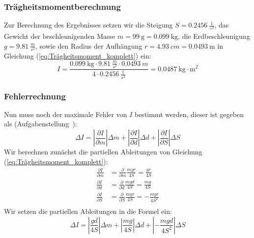 \documentclass{article}
\begin{document}
	\subsubsection{Trägheitsmomentberechnung}
	Zur Berechnung des Ergebnisses setzen wir die Steigung \(S = \SI{0,2456}{\frac{1}{\second^2}} \), das Gewicht der beschleunigenden Masse \(m = \SI{99}{\gram} = \SI{0.099}{\kilogram}\), die Erdbeschleunigung
	\(g = \SI{9,81}{\frac{m}{s^2}} \), sowie den Radius der Aufhängung \(r = \SI{4.93}{cm} = \SI{0.0493}{\metre}\) in Gleichung (\ref{eq:Trägheitsmoment_komplett}) ein:
	\begin{equation}
		I = \frac{ \SI{0,099}{\kilogram} \cdot \SI{9,81}{\frac{m}{s^2}} \cdot \SI{0,0493}{m} }{ 4 \cdot \SI{0,2456}{\frac{1}{s^2}} } = \SI{0,0487}{\kilogram \cdot \metre^2}
	\end{equation}

	\subsubsection{Fehlerrechnung}
	Nun muss noch der maximale Fehler von \( I \) bestimmt werden, dieser ist gegeben als (Aufgabenstellung~\cite{AnleitungPraktikum}):
	\begin{equation}
		\Delta I =
		\left| \frac{\partial I}{\partial m} \right| \Delta m +
		\left| \frac{\partial I}{\partial d} \right| \Delta d +
		\left| \frac{\partial I}{\partial S} \right| \Delta S
	\end{equation}
	Wir berechnen zunächst die partiellen Ableitungen von Gleichung (\ref{eq:Trägheitsmoment_komplett}):
	\begin{equation}
		\begin{aligned}
			\frac{\partial I}{\partial m} & = \frac{\partial}{\partial m} \frac{m g r}{4S} = \frac{g r}{4S}     \\
			\frac{\partial I}{\partial d} & = \frac{\partial}{\partial d} \frac{m g d}{4S} = \frac{m g}{4S}     \\
			\frac{\partial I}{\partial S} & = \frac{\partial}{\partial S} \frac{m g r}{4S} = -\frac{m g r}{4S^2} \\
		\end{aligned}
	\end{equation}
	Wir setzen die partiellen Ableitungen in die Formel ein:
	\begin{equation}
		\Delta I =
		\left| \frac{g d}{4S} \right| \Delta m +
		\left| \frac{m g}{4S} \right| \Delta d +
		\left| -\frac{m g d}{4S^2} \right| \Delta S
	\end{equation}
\end{document}
